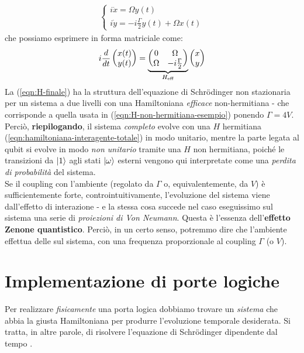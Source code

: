 \documentclass[../../InformazioneQuantistica.tex]{subfiles}
\begin{document}
\begin{align*}
\begin{cases}
i\dot{x} = \Omega y(t)\\
i\dot{y} = -i\frac{\Gamma}{2}y(t) + \Omega x(t)
\end{cases}
\end{align*}
che possiamo esprimere in forma matriciale come:
\begin{align}
i\frac{d}{dt}\begin{pmatrix} x(t)\\ y(t)\end{pmatrix} = 
\underbrace{\begin{pmatrix}
0 & \Omega\\ \Omega & -i\frac{\Gamma}{2}\end{pmatrix}}_{H_{\operatorname{eff}}}
 \begin{pmatrix}x \\ y \end{pmatrix}
 \label{eqn:H-finale}
\end{align}
La (\ref{eqn:H-finale}) ha la struttura dell'equazione di Schr\"odinger non stazionaria per un sistema a due livelli con una Hamiltoniana \textit{efficace} non-hermitiana - che corrisponde a quella usata in (\ref{eqn:H-non-hermitiana-esempio}) ponendo $\Gamma=4V$.\\

Perciò, \textbf{riepilogando}, il sistema \textit{completo} evolve con una $H$ hermitiana (\ref{eqn:hamiltoniana-interagente-totale}) in modo unitario, mentre la parte legata al qubit si evolve in modo \textit{non unitario} tramite una $H$ non hermitiana, poiché le transizioni da $\Ket{1}$ agli stati $\Ket{\omega}$ esterni vengono qui interpretate come una \textit{perdita di probabilità} del sistema.\\
Se il coupling con l'ambiente (regolato da $\Gamma$ o, equivalentemente, da $V$) è sufficientemente forte, controintuitivamente, l'evoluzione del sistema viene  dall'effetto di interazione - e la stessa cosa succede nel caso eseguissimo sul sistema una serie di \textit{proiezioni di Von Neumann}. Questa è l'essenza dell'\textbf{effetto Zenone quantistico}. Perciò, in un certo senso, potremmo dire che l'ambiente effettua delle  sul sistema, con una frequenza proporzionale al coupling $\Gamma$ (o $V$).

\section{Implementazione di porte logiche}
Per realizzare \textit{fisicamente} una porta logica dobbiamo trovare un \textit{sistema} che abbia la giusta Hamiltoniana per produrre l'evoluzione temporale desiderata. Si tratta, in altre parole, di risolvere l'equazione di Schr\"odinger dipendente dal tempo .\\
\end{document}
